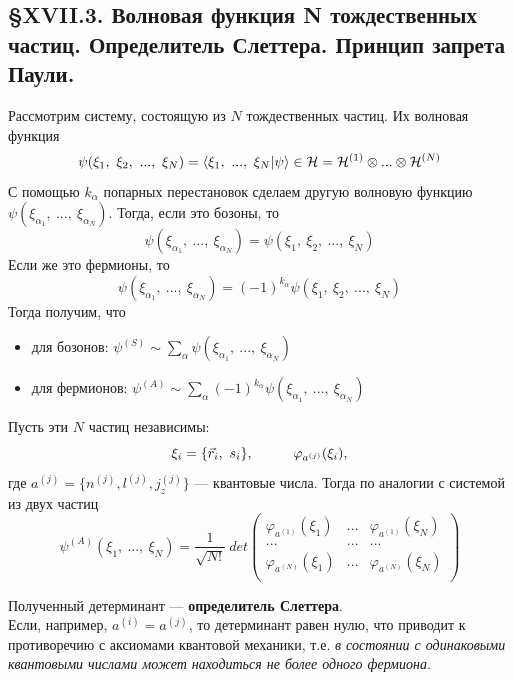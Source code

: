 \subsection{\S XVII.3. Волновая функция N тождественных частиц. Определитель Слеттера. Принцип запрета Паули. }
Рассмотрим систему, состоящую из $N$ тождественных частиц. Их волновая функция
\[
\psi(\xi_1,~ \xi_2,~ ...,~ \xi_N) = \langle \xi_1,~...,~\xi_N | \psi \rangle \in \mathcal{H} = \mathcal{H}^{(1)}\otimes ... \otimes \mathcal{H}^{(N)}
\]
С помощью $k_\alpha$ попарных перестановок сделаем другую волновую функцию $\psi(\xi_{\alpha_1},~ ...,~ \xi_{\alpha_N})$. Тогда, если это бозоны, то
\[
\psi(\xi_{\alpha_1},~ ...,~ \xi_{\alpha_N}) = \psi(\xi_1,~ \xi_2,~ ...,~ \xi_N)
\]
Если же это фермионы, то
\[
\psi(\xi_{\alpha_1},~ ...,~ \xi_{\alpha_N}) = (-1)^{k_\alpha}\psi(\xi_1,~ \xi_2,~ ...,~ \xi_N)
\]
Тогда получим, что
\begin{itemize}
	\item для бозонов: $\psi^{(S)} \sim \sum\limits_\alpha \psi(\xi_{\alpha_1},~ ...,~ \xi_{\alpha_N})$
	\item для фермионов: $\psi^{(A)} \sim \sum\limits_\alpha (-1)^{k_\alpha}\psi(\xi_{\alpha_1},~ ...,~ \xi_{\alpha_N})$
\end{itemize}

Пусть эти $N$ частиц независимы:
\[
\xi_i = \{\vec{r}_i,~s_i\}, \hspace*{1cm} \varphi_{a^{(j)}}(\xi_i),
\]
где $a^{(j)} = \{n^{(j)}, l^{(j)}, j_z^{(j)}\}$ --- квантовые числа. Тогда по аналогии с системой из двух частиц
\[
\psi^{(A)}(\xi_1,~ ...,~\xi_N) = \dfrac{1}{\sqrt{N!}}~det\begin{pmatrix}
	\varphi_{a^{(1)}}(\xi_1) & ... & \varphi_{a^{(1)}}(\xi_N)\\
	... & ... & ...\\
	\varphi_{a^{(N)}}(\xi_1) & ... & \varphi_{a^{(N)}}(\xi_N)\\
\end{pmatrix}
\]

Полученный детерминант --- \textbf{определитель Слеттера}.\\

Если, например, $a^{(i)} = a^{(j)}$, то детерминант равен нулю, что приводит к противоречию с аксиомами квантовой механики, т.е. \textit{в состоянии с одинаковыми квантовыми числами может находиться не более одного фермиона}.






